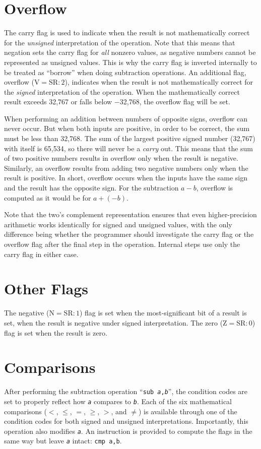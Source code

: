 \documentclass[12pt,english]{book}
\let\geq\geqslant
\let\leq\leqslant
\begin{document}
\section{Overflow}
The carry flag is used to indicate when the result
is not mathematically correct for the \emph{unsigned} interpretation
of the operation.
Note that this means that negation
sets the carry flag for \emph{all} nonzero values,
as negative numbers cannot be represented as unsigned values.
This is why the carry flag is inverted internally
to be treated as ``borrow'' when doing subtraction operations.
An additional flag, overflow (\(\text{V}=\text{SR}{:}2\)),
indicates when the result is not mathematically correct
for the \emph{signed} interpretation of the operation.
When the mathematically correct result exceeds 32,767
or falls below \(-\)32,768,
the overflow flag will be set.

When performing an addition between numbers of opposite signs,
overflow can never occur.
But when both inputs are positive,
in order to be correct, the sum must be less than 32,768.
The sum of the largest positive signed number (32,767)
with itself is 65,534, so there will never be a \emph{carry} out.
This means that the sum of two positive numbers results in overflow
only when the result is negative.
Similarly, an overflow results from adding two negative numbers
only when the result is positive.
In short, overflow occurs when the inputs have the same sign
and the result has the opposite sign.
For the subtraction \(a-b\),
overflow is computed as it would be for \(a+(-b)\).

Note that the two's complement representation
ensures that even higher-precision arithmetic
works identically for signed and unsigned values,
with the only difference being whether the programmer
should investigate the carry flag or the overflow flag
after the final step in the operation.
Internal steps use only the carry flag in either case.

\section{Other Flags}
The negative (\(\text{N}=\text{SR}{:}1\)) flag
is set when the most-significant bit of a result is set,
when the result is negative under signed interpretation.
The zero (\(\text{Z}=\text{SR}{:}0\)) flag
is set when the result is zero.

\section{Comparisons}
After performing the subtraction operation
``\texttt{sub \textit{a},\textit{b}}'',
the condition codes are set to properly reflect
how \texttt{\textit{a}} compares to \texttt{\textit{b}}.
Each of the six mathematical comparisons
(\(<\), \(\leq\), \(=\), \(\geq\), \(>\), and \(\neq\))
is available through one of the condition codes
for both signed and unsigned interpretations.
Importantly, this operation also modifies \texttt{\textit{a}}.
An instruction is provided to compute the flags in the same way
but leave \texttt{\textit{a}} intact:
\texttt{cmp a,b}.
\end{document}

